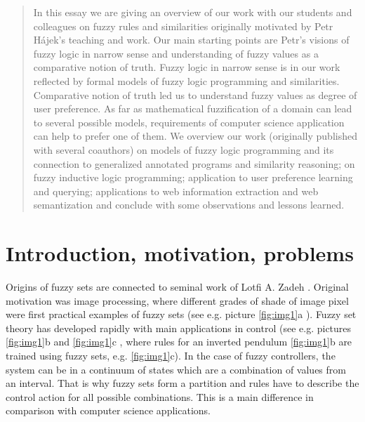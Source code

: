 \begin{abstract}
In this essay we are giving an overview of our work with our students and colleagues on fuzzy rules and similarities originally motivated by Petr H\'{a}jek's teaching and work. Our main starting points are Petr's visions of fuzzy logic in narrow sense and understanding of fuzzy values as a comparative notion of truth. Fuzzy logic in narrow sense is in our work reflected by formal models of fuzzy logic programming and similarities. Comparative notion of truth led us to understand fuzzy values as degree of user preference. As far as mathematical fuzzification of a domain can lead to several possible models, requirements of computer science application can help to prefer one of them. We overview our work (originally published with several coauthors) on models of fuzzy logic programming and its connection to generalized annotated programs and similarity reasoning; on fuzzy inductive logic programming; application to user preference learning and querying; applications to web information extraction and web semantization and conclude with some observations and lessons learned.
\end{abstract}


\section{Introduction, motivation, problems}

     Origins of fuzzy sets are connected to seminal work of Lotfi A. Zadeh \cite{Z}. Original motivation was image processing, where different grades of shade of image pixel were first practical examples of fuzzy sets (see e.g. picture \ref{fig:img1}a \cite{p1a}). Fuzzy set theory has developed rapidly with main applications in control (see e.g. pictures \ref{fig:img1}b and \ref{fig:img1}c \cite{p1bc}, where rules for an inverted pendulum \ref{fig:img1}b are trained using fuzzy sets, e.g. \ref{fig:img1}c). In the case of fuzzy controllers, the system can be in a continuum of states which are a combination of values from an interval. That is why fuzzy sets form a partition and rules have to describe the control action for all possible combinations. This is a main difference in comparison with computer science applications.



